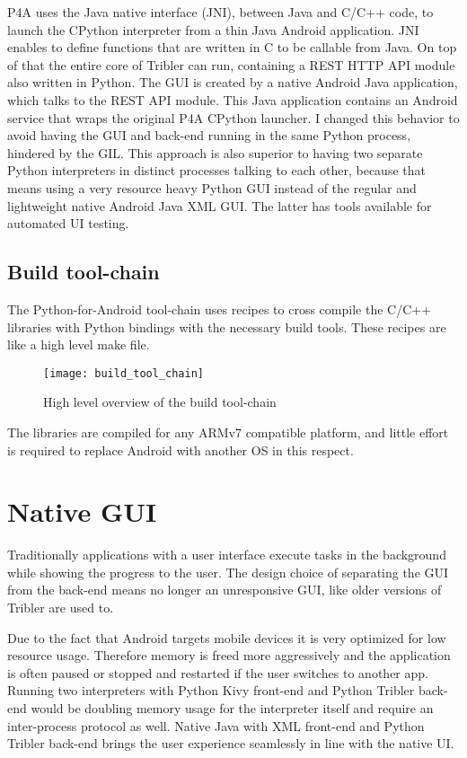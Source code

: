 P4A uses the Java native interface (JNI), between Java and C/C++ code, to launch the CPython interpreter from a thin Java Android application.
JNI enables to define functions that are written in C to be callable from Java.
On top of that the entire core of Tribler can run, containing a REST HTTP API module also written in Python.
The GUI is created by a native Android Java application, which talks to the REST API module.
This Java application contains an Android service that wraps the original P4A CPython launcher.
I changed this behavior to avoid having the GUI and back-end running in the same Python process, hindered by the GIL.
This approach is also superior to having two separate Python interpreters in distinct processes talking to each other, because that means using a very resource heavy Python GUI instead of the regular and lightweight native Android Java XML GUI.
The latter has tools available for automated UI testing.


\subsection{Build tool-chain}
The Python-for-Android tool-chain uses recipes to cross compile the C/C++ libraries with Python bindings with the necessary build tools.
These recipes are like a high level make file.

\begin{figure}[H]
	\centering
	\texttt{[image: build\_tool\_chain]}
	\caption{High level overview of the build tool-chain}
	\label{fig:build_tool_chain}
\end{figure}

The libraries are compiled for any ARMv7 compatible platform, and little effort is required to replace Android with another OS in this respect.


\section{Native GUI}
Traditionally applications with a user interface execute tasks in the background while showing the progress to the user.
The design choice of separating the GUI from the back-end means no longer an unresponsive GUI, like older versions of Tribler are used to.

Due to the fact that Android targets mobile devices it is very optimized for low resource usage.
Therefore memory is freed more aggressively and the application is often paused or stopped and restarted if the user switches to another app.
Running two interpreters with Python Kivy front-end and Python Tribler back-end would be doubling memory usage for the interpreter itself and require an inter-process protocol as well.
Native Java with XML front-end and Python Tribler back-end brings the user experience seamlessly in line with the native UI.

